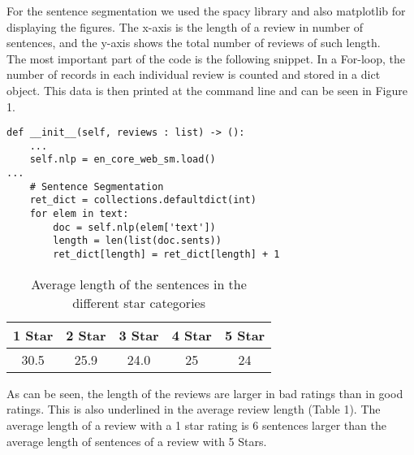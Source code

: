 For the sentence segmentation we used the spacy library and also matplotlib for displaying the figures. The x-axis is the length of a review in number of sentences, and the y-axis shows the total number of reviews of such length.\\
The most important part of the code is the following snippet. In a For-loop, the number of records in each individual review is counted and stored in a dict object. This data is then printed at the command line and can be seen in Figure 1.
\begin{Verbatim}
def __init__(self, reviews : list) -> ():
	...
	self.nlp = en_core_web_sm.load()
...
	# Sentence Segmentation
	ret_dict = collections.defaultdict(int)
	for elem in text:
		doc = self.nlp(elem['text'])
		length = len(list(doc.sents))
		ret_dict[length] = ret_dict[length] + 1
\end{Verbatim}
	\begin{center}
		\begin{table}[!h]
			\caption{Average length of the sentences in the different star categories}
			\begin{tabular}{c | c | c | c | c}
				1 Star & 2 Star & 3 Star  & 4 Star & 5 Star\\\hline
				30.5 & 25.9 & 24.0  & 25 & 24\\
			\end{tabular}
		\end{table}
	\end{center}
	
As can be seen, the length of the reviews are larger in bad ratings than in good ratings. This is also underlined in the average review length (Table 1). The average length of a review with a 1 star rating is 6 sentences larger than the average length of sentences of a review with 5 Stars. 
	